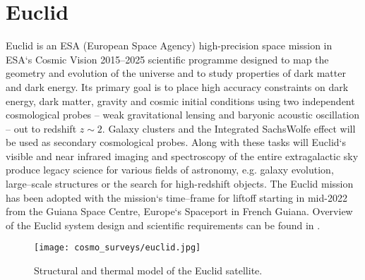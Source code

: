 \section{Euclid}
Euclid is an ESA (European Space Agency) high-precision space mission in ESA`s Cosmic Vision 2015--2025 scientific programme designed to map the geometry and evolution of the universe and to study properties of dark matter and dark energy. Its primary goal is to place high accuracy constraints on dark energy, dark matter, gravity and cosmic initial conditions using two independent cosmological probes -- weak gravitational lensing and baryonic acoustic oscillation -- out to redshift $z\sim2$. Galaxy clusters and the Integrated SachsWolfe effect will be used as secondary cosmological probes. Along with these tasks will Euclid`s visible and near infrared imaging and spectroscopy of the entire extragalactic sky produce legacy science for various fields of astronomy, e.g. galaxy evolution, large--scale structures or the search for high-redshift objects. The Euclid mission has been adopted with the mission`s time--frame for liftoff starting in mid-2022 from the Guiana Space Centre, Europe`s Spaceport in French Guiana. Overview of the Euclid system design and scientific requirements can be found in \cite{2011arXiv1110.3193L}.
\begin{figure}[htb]
    \centering
    \texttt{[image: cosmo\_surveys/euclid.jpg]}
    \caption{Structural and thermal model of the Euclid satellite.}
    \label{fig:euclid}
\end{figure}
\clearpage
